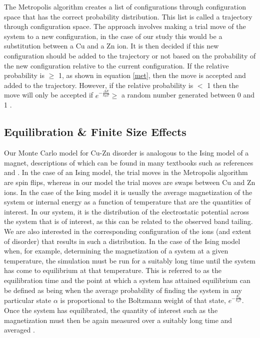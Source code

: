 The Metropolis algorithm creates a list of configurations through configuration space that has the correct probability distribution. This list is called a trajectory through configuration space. The approach involves making a trial move of the system to a new configuration, in the case of our study this would be a substitution between a Cu and a Zn ion. It is then decided if this new configuration should be added to the trajectory or not based on the probability of the new configuration relative to the current configuration. If the relative probability is  $\geq$ 1, as shown in equation \ref{met}, then the move is accepted and added to the trajectory. However, if the relative probability is $<$ 1 then the move will only be accepted if $e^{-\frac{\Delta E}{k_BT}} \ge$ a random number generated between 0 and 1 \cite{Lesar3}.


\subsection{Equilibration \& Finite Size Effects}
Our Monte Carlo model for Cu-Zn disorder is analogous to the Ising model of a magnet, descriptions of which can be found in many textbooks such as references  and . In the case of an Ising model, the trial moves in the Metropolis algorithm are spin flips, whereas in our model the trial moves are swaps between Cu and Zn ions. In the case of the Ising model it is usually the average magnetization of the system or internal energy as a function of temperature that are the quantities of interest. In our system, it is the distribution of the electrostatic potential across the system that is of interest, as this can be related to the observed band tailing. We are also interested in the corresponding configuration of the ions (and extent of disorder) that results in such a distribution. In the case of the Ising model when, for example, determining the magnetization of a system at a given temperature, the simulation must be run for a suitably long time until the system has come to equilibrium at that temperature. This is referred to as the equilibration time and the point at which a system has attained equilibrium can be defined as being when the average probability of finding the system in any particular state $\alpha$ is proportional to the Boltzmann weight of that state, $e^{-\frac{E_\alpha}{k_bT}}$. Once the system has equilibrated, the quantity of interest such as the magnetization must then be again measured over a suitably long time and averaged \cite{MC}.

